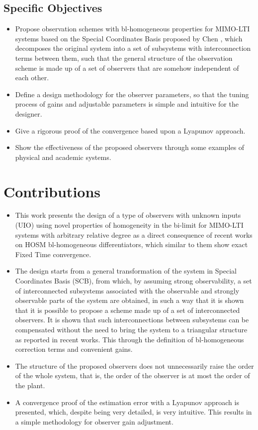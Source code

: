 \documentclass[11pt,letterpaper,twoside,openright]{report}
\begin{document}
\subsection{Specific Objectives}
\begin{itemize}
\item Propose observation schemes with bl-homogeneous properties for MIMO-LTI systems based on the Special Coordinates Basis proposed by Chen \cite{Chen2004}, which decomposes the original system into a set of subsystems with interconnection terms between them, such that the general structure of the observation scheme is made up of a set of observers that are somehow independent of each other.

\item Define a design methodology for the observer parameters, so that the tuning process of gains and adjustable parameters is simple and intuitive for the designer.

\item Give a rigorous proof of the convergence based upon a Lyapunov approach.

\item Show the effectiveness of the proposed observers through some examples of physical and academic systems.
\end{itemize}


\section{Contributions}
\begin{itemize}
\item This work presents the design of a type of observers with unknown inputs (UIO) using novel properties of homogeneity in the bi-limit for MIMO-LTI systems with arbitrary relative degree as a direct consequence of recent works on HOSM bl-homogeneous differentiators, which similar to them show exact Fixed Time convergence.

\item The design starts from a general transformation of the system in Special Coordinates Basis (SCB), from which, by assuming strong observability, a set of interconnected subsystems associated with the observable and strongly observable parts of the system are obtained, in such a way that it is shown that it is possible to propose a scheme made up of a set of interconnected observers. It is shown that such interconnections between subsystems can be compensated without the need to bring the system to a triangular structure as reported in recent works. This through the definition of bl-homogeneous correction terms and convenient gains.

\item The structure of the proposed observers does not unnecessarily raise the order of the whole system, that is, the order of the observer is at most the order of the plant.

\item A convergence proof of the estimation error with a Lyapunov approach is presented, which, despite being very detailed, is very intuitive. This results in a simple methodology for observer gain adjustment.
\end{itemize}
\end{document}
